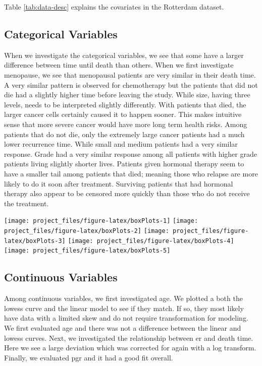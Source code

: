 \documentclass[
]{article}
\begin{document}
Table \ref{tab:data-desc} explains the covariates in the Rotterdam
dataset.

\subsection{Categorical Variables}

When we investigate the categorical variables, we see that some have a larger difference between time until death than others. When we first investigate menopause, we see that menopausal patients are very similar in their death time. A very similar pattern is observed for chemotherapy but the patients that did not die had a slightly higher time before leaving the study. While size, having three levels, needs to be interpreted slightly differently. With patients that died, the larger cancer cells certainly caused it to happen sooner. This makes intuitive sense that more severe cancer would have more long term health risks. Among patients that do not die, only the extremely large cancer patients had a much lower recurrence time. While small and medium patients had a very similar response. Grade had a very similar response among all patients with higher grade patients living slightly shorter lives. Patients given hormonal therapy seem to have a smaller tail among patients that died; meaning those who relapse are more likely to do it soon after treatment. Surviving patients that had hormonal therapy also appear to be censored more quickly than those who do not receive the treatment.

\texttt{[image: project\_files/figure-latex/boxPlots-1]} \texttt{[image: project\_files/figure-latex/boxPlots-2]} \texttt{[image: project\_files/figure-latex/boxPlots-3]} \texttt{[image: project\_files/figure-latex/boxPlots-4]} \texttt{[image: project\_files/figure-latex/boxPlots-5]}

\subsection{Continuous Variables}

Among continuous variables, we first investigated age. We plotted a both the lowess curve and the linear model to see if they match. If so, they most likely have data with a limited skew and do not require transformation for modeling. We first evaluated age and there was not a difference between the linear and lowess curves. Next, we investigated the relationship between er and death time. Here we see a large deviation which was corrected for again with a log transform. Finally, we evaluated pgr and it had a good fit overall.
\end{document}
